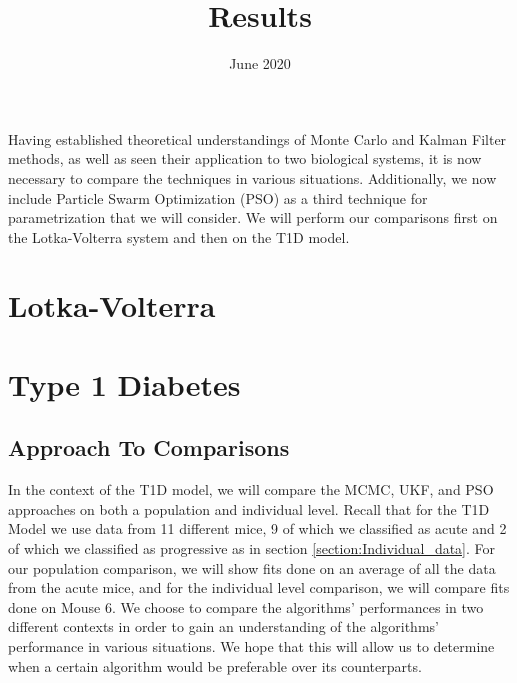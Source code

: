 \documentclass{article}
\title{Results}
\date{June 2020}
\begin{document}
\maketitle

Having established theoretical understandings of Monte Carlo and Kalman Filter methods, as well as seen their application to two biological systems, it is now necessary to compare the techniques in various situations. Additionally, we now include Particle Swarm Optimization (PSO) as a third technique for parametrization that we will consider. We will perform our comparisons first on the Lotka-Volterra system and then on the T1D model.

\section{Lotka-Volterra}


\section{Type 1 Diabetes}

\subsection{Approach To Comparisons}

In the context of the T1D model, we will compare the MCMC, UKF, and PSO approaches on both a population and individual level. Recall that for the T1D Model we use data from 11 different mice, 9 of which we classified as acute and 2 of which we classified as progressive as in section \ref{section:Individual_data}. For our population comparison, we will show fits done on an average of all the data from the acute mice, and for the individual level comparison, we will compare fits done on Mouse 6. We choose to compare the algorithms' performances in two different contexts in order to gain an understanding of the algorithms' performance in various situations. We hope that this will allow us to determine when a certain algorithm would be preferable over its counterparts.
\end{document}
